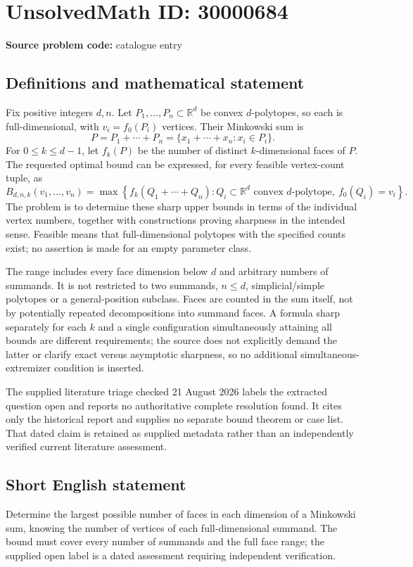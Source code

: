 \documentclass[11pt]{article}
\newcommand{\R}{\mathbb{R}}
\begin{document}
\section*{UnsolvedMath ID: 30000684}
\textbf{Source problem code:} catalogue entry
\subsection{Definitions and mathematical statement}
Fix positive integers $d,n$. Let $P_1,\ldots,P_n\subset\R^d$ be convex $d$-polytopes, so each is full-dimensional, with $v_i=f_0(P_i)$ vertices. Their Minkowski sum is
\[
 P=P_1+\cdots+P_n
  =\{x_1+\cdots+x_n:x_i\in P_i\}.
\]
For $0\leq k\leq d-1$, let $f_k(P)$ be the number of distinct $k$-dimensional faces of $P$. The requested optimal bound can be expressed, for every feasible vertex-count tuple, as
\[
 B_{d,n,k}(v_1,\ldots,v_n)
 =\max\left\{f_k(Q_1+\cdots+Q_n):
       Q_i\subset\R^d\text{ convex }d\text{-polytope},\ f_0(Q_i)=v_i\right\}.
\]
The problem is to determine these sharp upper bounds in terms of the individual vertex numbers, together with constructions proving sharpness in the intended sense. Feasible means that full-dimensional polytopes with the specified counts exist; no assertion is made for an empty parameter class.

The range includes every face dimension below $d$ and arbitrary numbers of summands. It is not restricted to two summands, $n\leq d$, simplicial/simple polytopes or a general-position subclass. Faces are counted in the sum itself, not by potentially repeated decompositions into summand faces. A formula sharp separately for each $k$ and a single configuration simultaneously attaining all bounds are different requirements; the source does not explicitly demand the latter or clarify exact versus asymptotic sharpness, so no additional simultaneous-extremizer condition is inserted.

The supplied literature triage checked 21 August 2026 labels the extracted question open and reports no authoritative complete resolution found. It cites only the historical report and supplies no separate bound theorem or case list. That dated claim is retained as supplied metadata rather than an independently verified current literature assessment.
\subsection{Short English statement}
Determine the largest possible number of faces in each dimension of a Minkowski sum, knowing the number of vertices of each full-dimensional summand. The bound must cover every number of summands and the full face range; the supplied open label is a dated assessment requiring independent verification.
\end{document}
